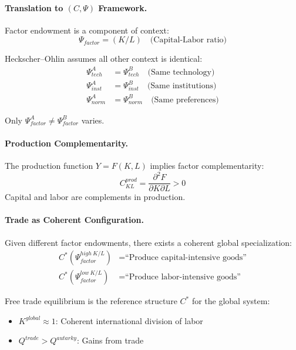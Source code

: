 \paragraph{Translation to $(C, \Psi)$ Framework.}
Factor endowment is a component of context:
\begin{equation}
  \Psi_{factor} = (K/L) \quad \text{(Capital-Labor ratio)}
\end{equation}

Heckscher--Ohlin assumes all other context is identical:
\begin{align}
  \Psi_{tech}^A &= \Psi_{tech}^B \quad \text{(Same technology)} \\
  \Psi_{inst}^A &= \Psi_{inst}^B \quad \text{(Same institutions)} \\
  \Psi_{norm}^A &= \Psi_{norm}^B \quad \text{(Same preferences)}
\end{align}

Only $\Psi_{factor}^A \neq \Psi_{factor}^B$ varies.

\paragraph{Production Complementarity.}
The production function $Y = F(K, L)$ implies factor complementarity:
\begin{equation}
  C_{KL}^{prod} = \frac{\partial^2 F}{\partial K \partial L} > 0
\end{equation}
Capital and labor are complements in production.

\paragraph{Trade as Coherent Configuration.}
Given different factor endowments, there exists a coherent global specialization:
\begin{align}
  C^*(\Psi_{factor}^{high\ K/L}) &= \text{``Produce capital-intensive goods''} \\
  C^*(\Psi_{factor}^{low\ K/L}) &= \text{``Produce labor-intensive goods''}
\end{align}

Free trade equilibrium is the reference structure $C^*$ for the global system:
\begin{itemize}
  \item $K^{global} \approx 1$: Coherent international division of labor
  \item $Q^{trade} > Q^{autarky}$: Gains from trade
\end{itemize}

